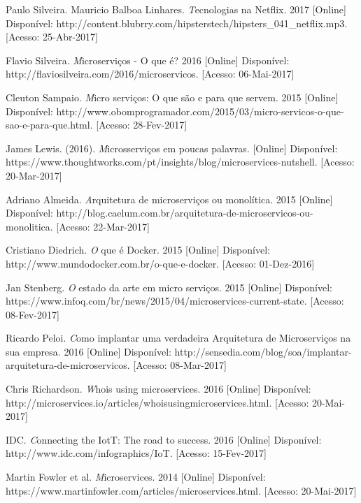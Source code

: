 \documentclass[journal]{IEEEtran}
\begin{document}
\begin{thebibliography}{1}

Paulo Silveira. Mauricio Balboa Linhares. \emph Tecnologias na Netflix. 2017 [Online] Disponível: http://content.blubrry.com/hipsterstech/hipsters\_041\_netflix.mp3. [Acesso: 25-Abr-2017]

Flavio Silveira. \emph Microserviços - O que é? 2016 [Online] Disponível:
http://flaviosilveira.com/2016/microservicos. [Acesso: 06-Mai-2017]

Cleuton Sampaio. \emph Micro serviços: O que são e para que servem. 2015 [Online] Disponível: http://www.obomprogramador.com/2015/03/micro-servicos-o-que-sao-e-para-que.html. [Acesso: 28-Fev-2017] 

James Lewis. (2016). \emph Microsserviços em poucas palavras. [Online] Disponível: https://www.thoughtworks.com/pt/insights/blog/microservices-nutshell. [Acesso: 20-Mar-2017]

Adriano Almeida. \emph Arquitetura de microserviços ou monolítica. 2015 [Online] Disponível: http://blog.caelum.com.br/arquitetura-de-microservicos-ou-monolitica. [Acesso: 22-Mar-2017]

Cristiano Diedrich. \emph O que é Docker. 2015 [Online] Disponível: http://www.mundodocker.com.br/o-que-e-docker. [Acesso: 01-Dez-2016]

Jan Stenberg. \emph O estado da arte em micro serviços. 2015 [Online] Disponível: https://www.infoq.com/br/news/2015/04/microservices-current-state. [Acesso: 08-Fev-2017]

Ricardo Peloi. \emph Como implantar uma verdadeira Arquitetura de Microserviços na sua empresa. 2016 [Online] Disponível: http://sensedia.com/blog/soa/implantar-arquitetura-de-microservicos. [Acesso: 08-Mar-2017]

Chris Richardson. \emph Whois using microservices. 2016 [Online] Disponível: http://microservices.io/articles/whoisusingmicroservices.html. [Acesso: 20-Mai-2017]

IDC. \emph Connecting the IotT: The road to success. 2016 [Online] Disponível: http://www.idc.com/infographics/IoT. [Acesso: 15-Fev-2017]

Martin Fowler et al. \emph Microservices. 2014 [Online] Disponível: https://www.martinfowler.com/articles/microservices.html. [Acesso: 20-Mai-2017]


\end{thebibliography}
\end{document}
